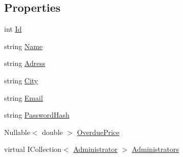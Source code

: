 \subsection*{Properties}
\begin{DoxyCompactItemize}
\item 
int \mbox{\hyperlink{class_easy_library_application_1_1_w_p_f_1_1_model_1_1_library_a38289c43dcbd3bda84338c951032c9d2}{Id}}
\item 
string \mbox{\hyperlink{class_easy_library_application_1_1_w_p_f_1_1_model_1_1_library_a757e8604423cd5ca48acf5728989a79b}{Name}}
\item 
string \mbox{\hyperlink{class_easy_library_application_1_1_w_p_f_1_1_model_1_1_library_a2097ce8facc81efdd64c0132084625a8}{Adress}}
\item 
string \mbox{\hyperlink{class_easy_library_application_1_1_w_p_f_1_1_model_1_1_library_ae167817256876a92323c1b673af3f1e0}{City}}
\item 
string \mbox{\hyperlink{class_easy_library_application_1_1_w_p_f_1_1_model_1_1_library_a8b9ac8735e99f1db0ad144416fb903bf}{Email}}
\item 
string \mbox{\hyperlink{class_easy_library_application_1_1_w_p_f_1_1_model_1_1_library_a0c74f47ed2450a7c4b1fc8cf410daaec}{Password\+Hash}}
\item 
Nullable$<$ double $>$ \mbox{\hyperlink{class_easy_library_application_1_1_w_p_f_1_1_model_1_1_library_aec4ff978bf9dca384c66dd0510e20347}{Overdue\+Price}}
\item 
virtual I\+Collection$<$ \mbox{\hyperlink{class_easy_library_application_1_1_w_p_f_1_1_model_1_1_administrator}{Administrator}} $>$ \mbox{\hyperlink{class_easy_library_application_1_1_w_p_f_1_1_model_1_1_library_a4b725023c770869121ce418ea5f4949d}{Administrators}}
\item 

\end{DoxyCompactItemize}

